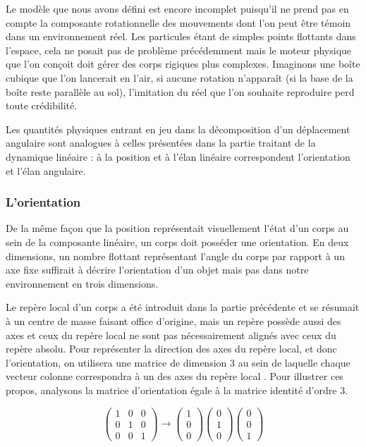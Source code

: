 Le modèle que nous avons défini est encore incomplet puisqu'il ne prend pas en compte la composante rotationnelle des mouvements dont l'on peut être témoin dans un environnement réel. Les particules étant de simples points flottants dans l'espace, cela ne posait pas de problème précédemment mais le moteur physique que l'on conçoit doit gérer des corps rigiques plus complexes. Imaginons une boîte cubique que l'on lancerait en l'air, si aucune rotation n'apparaît (si la base de la boîte reste parallèle au sol), l'imitation du réel que l'on souhaite reproduire perd toute crédibilité.

Les quantités physiques entrant en jeu dans la décomposition d'un déplacement angulaire sont analogues à celles présentées dans la partie traitant de la dynamique linéaire : à la position et à l'élan linéaire correspondent l'orientation et l'élan angulaire.

\subsubsection{L'orientation}

De la même façon que la position représentait visuellement l'état d'un corps au sein de la composante linéaire, un corps doit posséder une orientation. En deux dimensions, un nombre flottant représentant l'angle du corps par rapport à un axe fixe suffirait à décrire l'orientation d'un objet mais pas dans notre environnement en trois dimensions.

Le repère local d'un corps a été introduit dans la partie précédente et se résumait à un centre de masse faisant office d'origine, mais un repère possède aussi des axes et ceux du repère local ne sont pas nécessairement alignés avec ceux du repère absolu. Pour représenter la direction des axes du repère local, et donc l'orientation, on utilisera une matrice de dimension 3 au sein de laquelle chaque vecteur colonne correspondra à un des axes du repère local \cite{witkit97}. Pour illustrer ces propos, analysons la matrice d'orientation égale à la matrice identité d'ordre 3.

\[
\begin{pmatrix}
  1 & 0 & 0 \\
  0 & 1 & 0 \\
  0 & 0 & 1
\end{pmatrix}
\rightarrow
\begin{pmatrix}
  1 \\
  0 \\
  0 
\end{pmatrix}
\begin{pmatrix}
  0 \\
  1 \\
  0 
\end{pmatrix}
\begin{pmatrix}
  0 \\
  0 \\
  1 
\end{pmatrix}
\]

